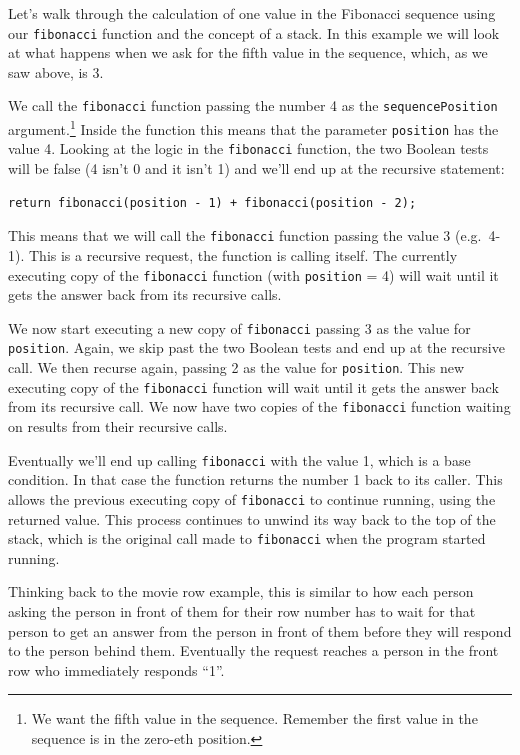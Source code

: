 Let's walk through the calculation of one value in the Fibonacci sequence using our \texttt{fibonacci} function and the concept of a stack. In this example we will look at what happens when we ask for the fifth value in the sequence, which, as we saw above, is 3.

We call the \texttt{fibonacci} function passing the number 4 as the \texttt{sequencePosition} argument.\footnote{We want the fifth value in the sequence. Remember the first value in the sequence is in the zero-eth position.} Inside the function this means that the parameter \texttt{position} has the value 4. Looking at the logic in the \texttt{fibonacci} function, the two Boolean tests will be false (4 isn't 0 and it isn't 1) and we'll end up at the recursive statement:

\beforeverb
\begin{verbatim}
return fibonacci(position - 1) + fibonacci(position - 2);
\end{verbatim}
\afterverb

This means that we will call the \texttt{fibonacci} function passing the value 3 \mbox{(e.g. 4-1)}. This is a recursive request, the function is calling itself. The currently executing copy of the \texttt{fibonacci} function (with \texttt{position} = 4) will wait until it gets the answer back from its recursive calls.

We now start executing a new copy of \texttt{fibonacci} passing 3 as the value for \texttt{position}. Again, we skip past the two Boolean tests and end up at the recursive call. We then recurse again, passing 2 as the value for \texttt{position}. This new executing copy of the \texttt{fibonacci} function will wait until it gets the answer back from its recursive call. We now have two copies of the \texttt{fibonacci} function waiting on results from their recursive calls.

Eventually we'll end up calling \texttt{fibonacci} with the value 1, which is a base condition. In that case the function returns the number 1 back to its caller. This allows the previous executing copy of \texttt{fibonacci} to continue running, using the returned value. This process continues to unwind its way back to the top of the stack, which is the original call made to \texttt{fibonacci} when the program started running.

Thinking back to the movie row example, this is similar to how each person asking the person in front of them for their row number has to wait for that person to get an answer from the person in front of them before they will respond to the person behind them. Eventually the request reaches a person in the front row who immediately responds ``1''.


